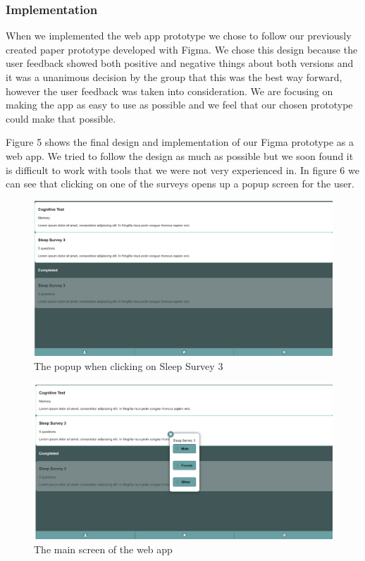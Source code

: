 \documentclass{article}
\begin{document}
\subsubsection{Implementation}
When we implemented the web app prototype we chose to follow our previously created paper prototype developed with Figma. We chose this design because the user feedback showed both positive and negative things about both versions and it was a unanimous decision by the group that this was the best way forward, however the user feedback was taken into consideration. We are focusing on making the app as easy to use as possible and we feel that our chosen prototype could make  that possible. 

Figure 5 shows the final design and implementation of our Figma prototype as a web app. We tried to follow the design as much as possible but we soon found it is difficult to work with tools that we were not very experienced in. In figure 6 we can see that clicking on one of the surveys opens up a popup screen for the user.

\begin{figure}[!h]
  \begin{center}
    \includegraphics[scale=0.8]{WebApp1.png}
    \caption{The popup when clicking on Sleep Survey 3
}
    \label{fig:webapp2}
  \end{center}
\end{figure}

\begin{figure}[!h]
  \begin{center}
    \includegraphics[scale=0.8]{WebApp2.png}
    \caption{The main screen of the web app
}
    \label{fig:webapp1}
  \end{center}
\end{figure}
\end{document}
